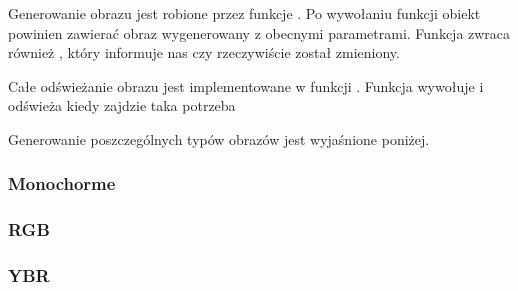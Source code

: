 Generowanie obrazu jest robione przez funkcje .
Po wywołaniu funkcji obiekt  powinien zawierać obraz wygenerowany z obecnymi parametrami.
Funkcja zwraca również , który informuje nas czy  rzeczywiście został zmieniony.

Całe odświeżanie obrazu jest implementowane w funkcji .
Funkcja wywołuje  i odświeża  kiedy zajdzie taka potrzeba

Generowanie poszczególnych typów obrazów jest wyjaśnione poniżej.

\subsubsection{Monochorme}


\subsubsection{RGB}


\subsubsection{YBR}
